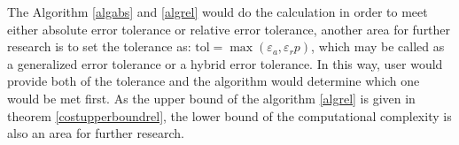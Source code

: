 \documentclass{iitthesis}
\begin{document}
The Algorithm \ref{algabs} and \ref{algrel} would do the calculation in order to meet either absolute error tolerance or relative error tolerance, another area for further research is to set the tolerance as: $\text{tol} = \max(\varepsilon_a, \varepsilon_r p)$, which may be called as a generalized error tolerance or a hybrid error tolerance. In this way, user would provide both of the tolerance and the algorithm would determine which one would be met first. As the upper bound of the algorithm \ref{algrel} is given in theorem \ref{costupperboundrel}, the lower bound of the computational complexity is also an area for further research. 






%



%
%
%
\end{document}
